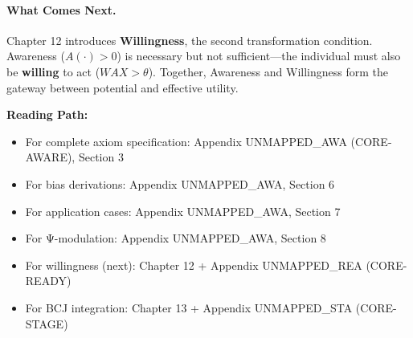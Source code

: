 \paragraph{What Comes Next.}
Chapter 12 introduces \textbf{Willingness}, the second transformation condition.
Awareness ($A(\cdot) > 0$) is necessary but not sufficient---the individual must
also be \textbf{willing} to act ($WAX > \theta$). Together, Awareness and Willingness
form the gateway between potential and effective utility.

\begin{cross-reference}
\textbf{Reading Path:}
\begin{itemize}
    \item For complete axiom specification: Appendix UNMAPPED_AWA (CORE-AWARE), Section 3
    \item For bias derivations: Appendix UNMAPPED_AWA, Section 6
    \item For application cases: Appendix UNMAPPED_AWA, Section 7
    \item For Ψ-modulation: Appendix UNMAPPED_AWA, Section 8
    \item For willingness (next): Chapter 12 + Appendix UNMAPPED_REA (CORE-READY)
    \item For BCJ integration: Chapter 13 + Appendix UNMAPPED_STA (CORE-STAGE)
\end{itemize}
\end{cross-reference}



